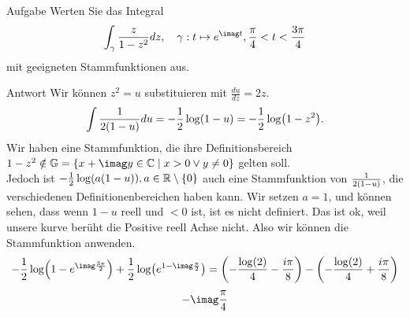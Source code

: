 \documentclass{scrartcl}
\begin{document}
\begin{section}{Aufgabe}%
Werten Sie das Integral
\[\int_{\gamma}\frac{z}{1-z^2}dz,\quad \gamma:t\mapsto e^{\imag t},\frac{\pi}{4}<t<\frac{3 \pi}{4}\]
mit geeigneten Stammfunktionen aus.
    \begin{subsection}{Antwort}
        Wir können $z^2=u$ substituieren mit $\frac{du}{dz}=2z$.
        \[\int \frac{1}{2\qty(1-u)}du=-\frac{1}{2}\log(1-u)=-\frac{1}{2}\log(1-z^2).\]
        Wir haben eine Stammfunktion, die ihre Definitionsbereich $1-z^2\notin \mathbb G=\qty{x+\imag y\in \bC \mid x>0 \lor y\neq 0}$ gelten soll.\\
        Jedoch ist $-\frac{1}{2}\log(a(1-u)),a\in\mathbb{R}\setminus\qty{0}$ auch eine Stammfunktion von $\frac{1}{2\qty(1-u)}$, die verschiedenen Definitionenbereichen haben kann.
        Wir setzen $a=1$, und können sehen, dass wenn $1-u$ reell und $<0$ ist, ist es nicht definiert.
        Das ist ok, weil unsere kurve berüht die Positive reell Achse nicht. Also wir können die Stammfunktion anwenden.
        \[-\frac{1}{2}\log(1-e^{\imag \frac{3 \pi}{2}})+\frac{1}{2}\log(e^{1-\imag \frac{\pi}{2}})
        =\qty(-\frac{\log (2)}{4}-\frac{i \pi }{8})-\qty(-\frac{\log (2)}{4}+\frac{i \pi }{8})\]
        \[- \imag \frac{\pi}4\]

    \end{subsection}
\end{section}
\end{document}
